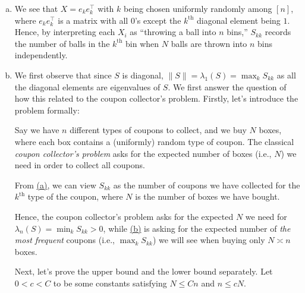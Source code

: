 \begin{answer}
	\begin{enumerate}[(a)]
		\item We see that \(X = e_k e_k ^{\top} \) with \(k\) being chosen uniformly randomly among \([n]\), where \(e_k e_k ^{\top} \) is a matrix with all \(0\)'s except the \(k^{\text{th} }\) diagonal element being \(1\). Hence, by interpreting each \(X_i\) as ``throwing a ball into \(n\) bins,'' \(S_{k k}\) records the number of balls in the \(k^{\text{th} }\) bin when \(N\) balls are thrown into \(n\) bins independently.
		\item We first observe that since \(S\) is diagonal, \(\lVert S \rVert = \lambda _1(S) = \max _k S_{k k}\) as all the diagonal elements are eigenvalues of \(S\). We first answer the question of how this related to the coupon collector's problem. Firstly, let's introduce the problem formally:

		      \begin{problem}
		      Say we have \(n\) different types of coupons to collect, and we buy \(N\) boxes, where each box contains a (uniformly) random type of coupon. The classical \emph{coupon collector's problem} asks for the expected number of boxes (i.e., \(N\)) we need in order to collect all coupons.
		      \end{problem}

		      \begin{intuition}
			      From \hyperref[ex5.4.14:a]{(a)}, we can view \(S_{k k}\) as the number of coupons we have collected for the \(k^{\text{th}}\) type of the coupon, where \(N\) is the number of boxes we have bought.
		      \end{intuition}

		      Hence, the coupon collector's problem asks for the expected \(N\) we need for \(\lambda _n (S) = \min _{k} S_{k k} > 0\), while \hyperref[ex5.4.14:b]{(b)} is asking for the expected number of \emph{the most frequent} coupons (i.e., \(\max_{k} S_{k k}\)) we will see when buying only \(N \asymp n\) boxes.

		      Next, let's prove the upper bound and the lower bound separately. Let \(0 < c < C\) to be some constants satisfying \(N \leq Cn\) and \(n \leq c N\).


\end{enumerate}
\end{answer}

